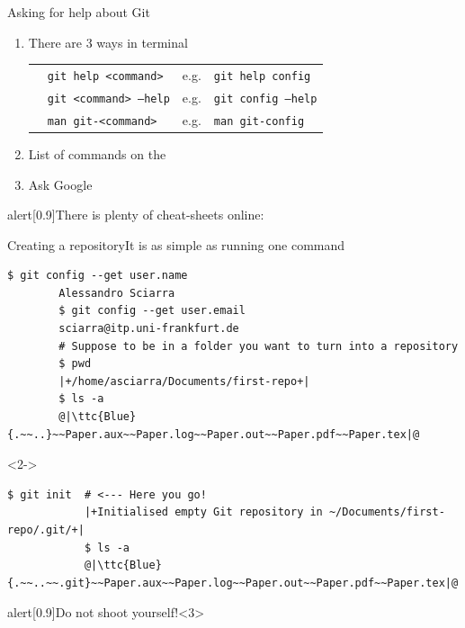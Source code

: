 \documentclass[usenames,svgnames,14pt]{beamer}
\newcommand{\ttc}[2]{\texttt{\textcolor{#1}{#2}}}
\begin{document}
\begin{frame}{Asking for help about Git}
    \vspace{-0.05\textheight}
    \begin{enumerate}
        \item There are 3 ways in terminal\\[1mm]
              {\small
              \begin{tabular}{c@{\;}l@{\quad}c@{\quad}l}
                  \PP{$\circ$} & \texttt{git help <command>}   & e.g. & \texttt{git help config}   \\
                  \PP{$\circ$} & \texttt{git <command> --help} & e.g. & \texttt{git config --help} \\
                  \PP{$\circ$} & \texttt{man git-<command>}    & e.g. & \texttt{man git-config}    \\
              \end{tabular}}
        \item List of commands on the 
        \item Ask Google
    \end{enumerate}
    \medskip
    \PrepareURLsymbol[PQ]
    \begin{varblock}{alert}[0.9\textwidth]{There is plenty of cheat-sheets online:}
        \qquad
        \qquad
    \end{varblock}
\end{frame}
\begin{frame}[fragile]{Creating a repository}{It is as simple as running one command}
    \begin{lstlisting}[style=MyBash]
        $ git config --get user.name
        Alessandro Sciarra
        $ git config --get user.email
        sciarra@itp.uni-frankfurt.de
        # Suppose to be in a folder you want to turn into a repository
        $ pwd
        |+/home/asciarra/Documents/first-repo+|
        $ ls -a
        @|\ttc{Blue}{.~~..}~~Paper.aux~~Paper.log~~Paper.out~~Paper.pdf~~Paper.tex|@
    \end{lstlisting}
    \begin{uncoverenv}<2->
        \begin{lstlisting}[style=MyBash]
            $ git init  # <--- Here you go!
            |+Initialised empty Git repository in ~/Documents/first-repo/.git/+|
            $ ls -a
            @|\ttc{Blue}{.~~..~~.git}~~Paper.aux~~Paper.log~~Paper.out~~Paper.pdf~~Paper.tex|@
        \end{lstlisting}
    \end{uncoverenv}
    \begin{varblock}{alert}[0.9\textwidth]{Do not shoot yourself!}<3>
    \end{varblock}
\end{frame}
\end{document}
